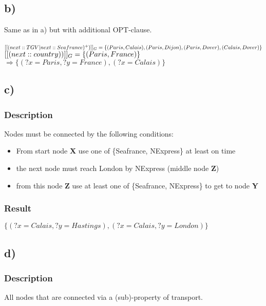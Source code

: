 \documentclass{article}
\begin{document}
\vspace{1cm}
\subsection*{b)}
Same as in a) but with additional OPT-clause.\\\\
$
[[(next :: TGV | next :: Seafrance)^+)]]_G  \\
= \{(Paris,Calais),(Paris,Dijon),(Paris,Dover),(Calais,Dover)\} \\\\
$
$
[[(next :: country ))]]_G  \\
= \{(Paris,France)\} \\\\
$
$
\Rightarrow
\{(?x = Paris,  ?y = France),(?x = Calais)\}
$


\vspace{1cm}
\subsection*{c)}
\subsubsection*{Description}
Nodes must be connected by the following conditions:\\
\begin{itemize}
  \item From start node \textbf{X} use one of \{Seafrance, NExpress\} at least
  on time
  \item the next node must reach London by NExpress (middle node \textbf{Z})
  \item from this node \textbf{Z} use at least one of \{Seafrance, NExpress\} to
  get to node \textbf{Y}
\end{itemize}
\subsubsection*{Result}
$\{(?x = Calais, ?y = Hastings),(?x = Calais, ?y = London)\}$

\vspace{1cm}
\subsection*{d)}
\subsubsection*{Description}
All nodes that are connected via a (sub)-property of transport.
\end{document}
